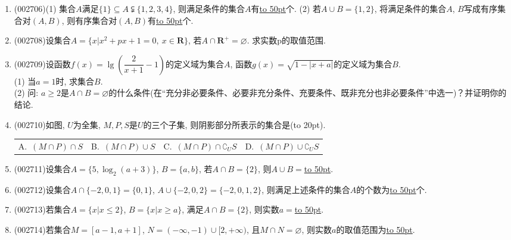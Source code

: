 \documentclass[10pt,a4paper]{article}
\newcommand{\blank}[1]{\underline{\hbox to #1pt{}}}
\newcommand{\bracket}[1]{(\hbox to #1pt{})}
\newcommand{\fourch}[4]{\par\begin{tabular}{p{.23\textwidth}p{.23\textwidth}p{.23\textwidth}p{.23\textwidth}}
A.~#1 &B.~#2& C.~#3& D.~#4
\end{tabular}}
\begin{document}
\begin{enumerate}[1.]
\item {\tiny (002706)}(1) 集合$A$满足$\{1\}\subseteq A \subsetneqq \{1,2,3,4\}$, 则满足条件的集合$A$有\blank{50}个.
(2) 若$A\cup B=\{1,2\}$, 将满足条件的集合$A$, $B$写成有序集合对$(A,B)$, 则有序集合对$(A,B)$有\blank{50}个.
\item {\tiny (002708)}设集合$A=\{x|x^2+px+1=0,\ x\in \mathbf{R}\}$, 若$A\cap \mathbf{R}^+=\varnothing$. 求实数p的取值范围.
\item {\tiny (002709)}设函数$f(x)=\lg (\dfrac2{x+1}-1)$的定义域为集合$A$, 函数$g(x)=\sqrt{1-|x+a|}$的定义域为集合$B$.\\
(1) 当$a=1$时, 求集合$B$.\\
(2) 问: $a\ge 2$是$A\cap B=\varnothing$的什么条件(在``充分非必要条件、必要非充分条件、充要条件、既非充分也非必要条件''中选一)？并证明你的结论.
\item {\tiny (002710)}如图, $U$为全集, $M,P,S$是$U$的三个子集, 则阴影部分所表示的集合是\bracket{20}.
\fourch{$(M\cap P)\cap S$}{$(M\cap P)\cup S$}{$(M\cap P)\cap \complement_U S$}{$(M\cap P)\cup \complement_U S$}
\begin{center}
\end{center}
\item {\tiny (002711)}设集合$A=\{5,\log_2(a+3)\}$, $B=\{a,b\}$, 若$A\cap B=\{2\}$, 则$A\cup B=$\blank{50}.
\item {\tiny (002712)}设集合$A\cap \{-2,0,1\}=\{0,1\}$, $A\cup \{-2,0,2\}=\{-2,0,1,2\}$, 则满足上述条件的集合$A$的个数为\blank{50}个.
\item {\tiny (002713)}若集合$A=\{x|x\le 2\}$, $B=\{x|x\ge a\}$, 满足$A\cap B=\{2\}$, 则实数$a=$\blank{50}.
\item {\tiny (002714)}若集合$M=[a-1,a+1]$, $N=(-\infty,-1)\cup [2,+\infty)$, 且$M\cap N=\varnothing$, 则实数$a$的取值范围为\blank{50}.

\end{enumerate}
\end{document}

